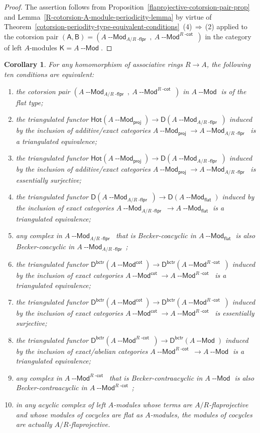 \documentclass[12pt,a4paper]{amsart}
\newcommand{\+}{\nobreakdash-}
\renewcommand{\:}{\colon}
\newcommand{\rarrow}{\longrightarrow}
\newcommand{\Modl}{{\operatorname{\mathsf{--Mod}}}}
\newcommand{\sA}{\mathsf A}
\newcommand{\sB}{\mathsf B}
\newcommand{\sD}{\mathsf D}
\newcommand{\sK}{\mathsf K}
\newcommand{\Hot}{\mathsf{Hot}}
\newcommand{\proj}{\mathsf{proj}}
\renewcommand{\flat}{\mathsf{flat}}
\renewcommand{\cot}{\mathsf{cot}}
\newcommand{\bctr}{\mathsf{bctr}}
\newcommand{\dcot}{{\operatorname{\mathsf{-cot}}}}
\newcommand{\dflpr}{{\operatorname{\mathsf{-flpr}}}}
\theoremstyle{plain}
\newtheorem{cor}[thm]{Corollary}
\theoremstyle{definition}
\begin{document}
\begin{proof}
 The assertion follows from
Proposition~\ref{flaprojective-cotorsion-pair-prop}
and Lemma~\ref{R-cotorsion-A-module-periodicity-lemma} by virtue of
Theorem~\ref{cotorsion-periodity-type-equivalent-conditions}\,%
(4)\,$\Rightarrow$\,(2) applied to the cotorsion pair
$(\sA,\sB)=(A\Modl_{A/R\dflpr},\>A\Modl^{R\dcot})$
in the category of left $A$\+modules $\sK=A\Modl$.
\end{proof}

\begin{cor} \label{flaprojective-conjecture-corollary}
 For any homomorphism of associative rings $R\rarrow A$,
the following ten conditions are equivalent:
\begin{enumerate}
\item the cotorsion pair $(A\Modl_{A/R\dflpr},\>A\Modl^{R\dcot})$ in
$A\Modl$ is of the flat type;
\item the triangulated functor\/ $\Hot(A\Modl_\proj)\rarrow
\sD(A\Modl_{A/R\dflpr})$ induced by the inclusion of additive/exact
categories $A\Modl_\proj\rarrow A\Modl_{A/R\dflpr}$ is a triangulated
equivalence;
\item the triangulated functor\/ $\Hot(A\Modl_\proj)\rarrow
\sD(A\Modl_{A/R\dflpr})$ induced by the inclusion of additive/exact
categories $A\Modl_\proj\rarrow A\Modl_{A/R\dflpr}$ is essentially
surjective;
\item the triangulated functor\/ $\sD(A\Modl_{A/R\dflpr})\rarrow
\sD(A\Modl_\flat)$ induced by the inclusion of exact categories
$A\Modl_{A/R\dflpr}\rarrow A\Modl_\flat$ is a triangulated equivalence;
\item any complex in $A\Modl_{A/R\dflpr}$ that is Becker-coacyclic
in $A\Modl_\flat$ is also Becker-coacyclic in $A\Modl_{A/R\dflpr}$;
\item the triangulated functor\/ $\sD^\bctr(A\Modl^\cot)\rarrow
\sD^\bctr(A\Modl^{R\dcot})$ induced by the inclusion of exact categories
$A\Modl^\cot\rarrow A\Modl^{R\dcot}$ is a triangulated equivalence;
\item the triangulated functor\/ $\sD^\bctr(A\Modl^\cot)\rarrow
\sD^\bctr(A\Modl^{R\dcot})$ induced by the inclusion of exact categories
$A\Modl^\cot\rarrow A\Modl^{R\dcot}$ is essentially surjective;
\item the triangulated functor\/ $\sD^\bctr(A\Modl^{R\dcot})\rarrow
\sD^\bctr(A\Modl)$ induced by the inclusion of exact/abelian categories
$A\Modl^{R\dcot}\rarrow A\Modl$ is a triangulated equivalence;
\item any complex in $A\Modl^{R\dcot}$ that is Becker-contraacyclic
in $A\Modl$ is also Becker-contraacyclic in $A\Modl^{R\dcot}$;
\item in any acyclic complex of left $A$\+modules whose terms are
$A/R$\+flaprojective and whose modules of cocycles are flat as
$A$\+modules, the modules of cocycles are actually $A/R$\+flaprojective.
\end{enumerate}
\end{cor}
\end{document}
